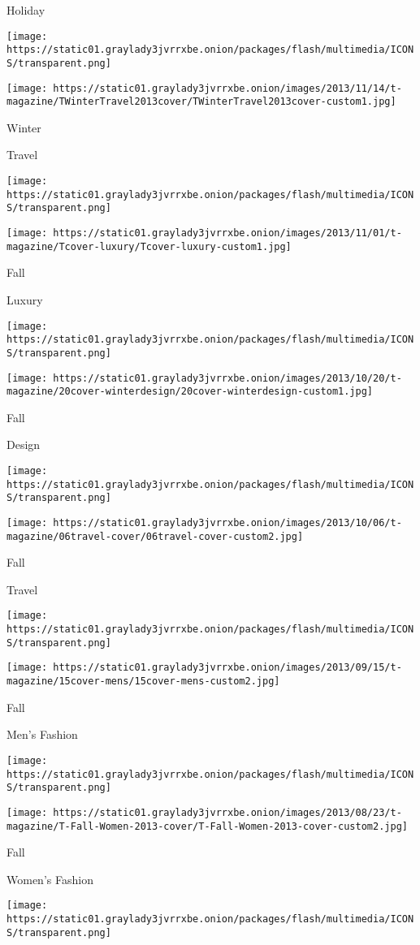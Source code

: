 Holiday

\texttt{[image: https://static01.graylady3jvrrxbe.onion/packages/flash/multimedia/ICONS/transparent.png]}

\texttt{[image: https://static01.graylady3jvrrxbe.onion/images/2013/11/14/t-magazine/TWinterTravel2013cover/TWinterTravel2013cover-custom1.jpg]}

Winter

Travel

\texttt{[image: https://static01.graylady3jvrrxbe.onion/packages/flash/multimedia/ICONS/transparent.png]}

\texttt{[image: https://static01.graylady3jvrrxbe.onion/images/2013/11/01/t-magazine/Tcover-luxury/Tcover-luxury-custom1.jpg]}

Fall

Luxury

\texttt{[image: https://static01.graylady3jvrrxbe.onion/packages/flash/multimedia/ICONS/transparent.png]}

\texttt{[image: https://static01.graylady3jvrrxbe.onion/images/2013/10/20/t-magazine/20cover-winterdesign/20cover-winterdesign-custom1.jpg]}

Fall

Design

\texttt{[image: https://static01.graylady3jvrrxbe.onion/packages/flash/multimedia/ICONS/transparent.png]}

\texttt{[image: https://static01.graylady3jvrrxbe.onion/images/2013/10/06/t-magazine/06travel-cover/06travel-cover-custom2.jpg]}

Fall

Travel

\texttt{[image: https://static01.graylady3jvrrxbe.onion/packages/flash/multimedia/ICONS/transparent.png]}

\texttt{[image: https://static01.graylady3jvrrxbe.onion/images/2013/09/15/t-magazine/15cover-mens/15cover-mens-custom2.jpg]}

Fall

Men's Fashion

\texttt{[image: https://static01.graylady3jvrrxbe.onion/packages/flash/multimedia/ICONS/transparent.png]}

\texttt{[image: https://static01.graylady3jvrrxbe.onion/images/2013/08/23/t-magazine/T-Fall-Women-2013-cover/T-Fall-Women-2013-cover-custom2.jpg]}

Fall

Women's Fashion

\texttt{[image: https://static01.graylady3jvrrxbe.onion/packages/flash/multimedia/ICONS/transparent.png]}

